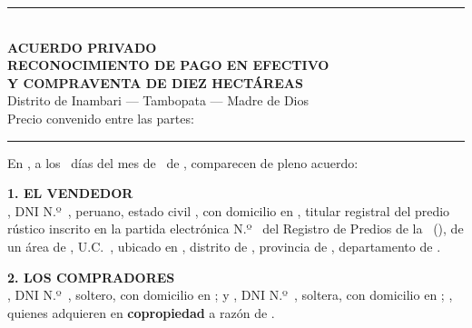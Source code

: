 \documentclass[12pt,a4paper]{article}
\begin{document}


\pagestyle{empty}
\renewcommand{\expedienteCorto}{}
\renewcommand{\codigoDoc}{}

\begin{center}
{\color{tinta}\rule{0.88\textwidth}{1.6pt}}\\[0.75em]
{\Large\bfseries\color{tinta}ACUERDO PRIVADO}\\[0.25em]
{\large\bfseries\color{tinta}RECONOCIMIENTO DE PAGO EN EFECTIVO}\\[0.15em]
{\large\bfseries\color{tinta}Y COMPRAVENTA DE DIEZ HECTÁREAS}\\[0.45em]
{\normalsize Distrito de Inambari --- Tambopata --- Madre de Dios}\\[0.35em]
{\small Precio convenido entre las partes: \textbf{\MontoPago}}\\[0.35em]
{\color{tinta}\rule{0.88\textwidth}{1.6pt}}
\end{center}

\vspace{0.55em}
\begin{center}
\end{center}

\vspace{0.85em}
\noindent En \textbf{\LugarOtorgamiento}, a los \DiaOtorgamiento\ días del mes de \MesOtorgamiento\ de \AnioOtorgamiento, comparecen de pleno acuerdo:

\vspace{0.55em}
\noindent\textbf{1. EL VENDEDOR}\\[0.2em]
\textbf{\VendedorNombreCompleto}, DNI N.º\ \VendedorDNI, peruano, estado civil \VendedorEstadoCivil, con domicilio en \linea[8.2cm], titular registral del predio rústico inscrito en la partida electrónica N.º\ \textbf{\PartidaMatriz} del Registro de Predios de la \OficinaRegistral\ (\ZonaRegistral), de un área de \AreaMatriz, U.C.\ \UnidadCatastral, ubicado en \UbicacionRegistral, distrito de \Distrito, provincia de \Provincia, departamento de \Departamento.

\vspace{0.55em}
\noindent\textbf{2. LOS COMPRADORES}\\[0.2em]
\textbf{\CompradorUnoNombre}, DNI N.º\ \CompradorUnoDNI, soltero, con domicilio en \CompradorUnoDomicilio; y \textbf{\CompradorDosNombre}, DNI N.º\ \CompradorDosDNI, soltera, con domicilio en \CompradorDosDomicilio; \textbf{\CompradorParentesco}, quienes adquieren en \textbf{copropiedad} a razón de \PorcentajeCopropiedad.
\end{document}
